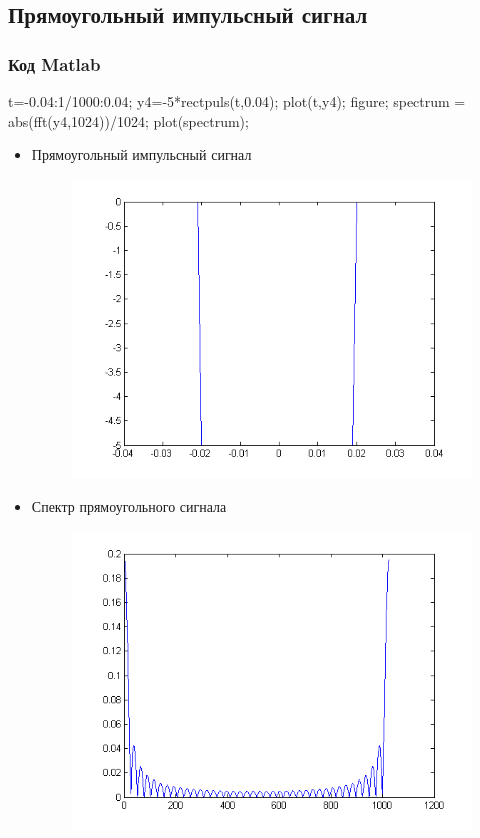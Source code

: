 \documentclass[10pt,a4paper]{article}
\begin{document}
\subsection{Прямоугольный импульсный сигнал}
\subsubsection{Код Matlab}
t=-0.04:1/1000:0.04;\newline
y4=-5*rectpuls(t,0.04);\newline
plot(t,y4);\newline
figure;\newline
spectrum = abs(fft(y4,1024))/1024;\newline
plot(spectrum);\newline
\begin{itemize}
\item Прямоугольный импульсный сигнал
\begin{figure}[h]
\centering
\includegraphics[width=12cm]{5_3.png} 
\end{figure}
\item Спектр прямоугольного сигнала
\begin{figure}[h]
\centering
\includegraphics[width=12cm]{5_4.png} 
\end{figure}
\end{itemize}
\FloatBarrier
\end{document}
